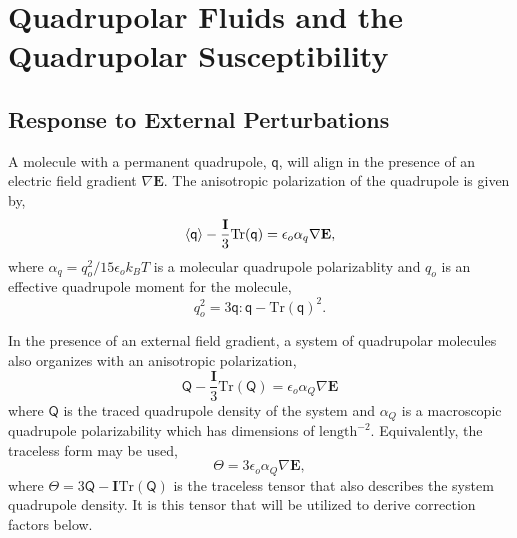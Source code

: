 \section{Quadrupolar Fluids and the Quadrupolar Susceptibility}
\subsection{Response to External Perturbations}

A molecule with a permanent quadrupole, $\mathsf{q}$, will align in
the presence of an electric field gradient $\nabla\mathbf{E}$.  The
anisotropic polarization of the quadrupole is given
by,\cite{AduGyamfi78,AduGyamfi81}
\begin{equation}
\braket{\mathsf{q}} - \frac{\mathbf{I}}{3}
\mathrm{Tr}(\mathsf{q}) = \epsilon_o \alpha_q \nabla\mathbf{E},
\end{equation}
where $\alpha_q = q_o^2 / 15 \epsilon_o k_B T $ is a molecular quadrupole
polarizablity and $q_o$ is an effective quadrupole moment for the molecule,
\begin{equation}
 q_o^2 = 3 \mathsf{q}:\mathsf{q} - \mathrm{Tr}(\mathsf{q})^2.
\end{equation}

In the presence of an external field gradient, a system of quadrupolar
molecules also organizes with an anisotropic polarization,
\begin{equation}
\mathsf{Q} - \frac{\mathbf{I}}{3} \mathrm{Tr}(\mathsf{Q}) =  \epsilon_o
\alpha_Q  \nabla\mathbf{E}
\end{equation}
where $\mathsf{Q}$ is the traced quadrupole density of the system and
$\alpha_Q$ is a macroscopic quadrupole polarizability which has
dimensions of $\mathrm{length}^{-2}$. Equivalently, the traceless form
may be used,
\begin{equation}
\mathsf{\Theta} = 3 \epsilon_o  \alpha_Q \nabla\mathbf{E},
\label{pertQuad}
\end{equation} 
where
$\mathsf{\Theta} = 3\mathsf{Q} - \mathbf{I} \mathrm{Tr}(\mathsf{Q})$
is the traceless tensor that also describes the system quadrupole
density.  It is this tensor that will be utilized to derive correction
factors below.


